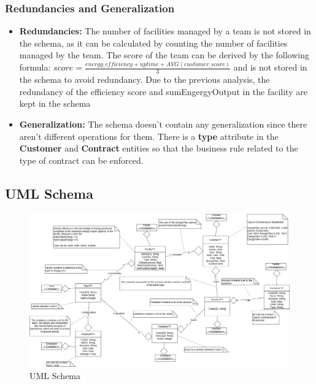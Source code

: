 \subsubsection{Redundancies and Generalization}
\begin{itemize}
    \item \textbf{Redundancies:} The number of facilities managed by a team is not stored in the schema, as it can be calculated by counting the number of facilities managed by the team. The score of the team can be derived by the following formula: $score = \frac{energy\_efficiency + uptime + AVG(customer\_score)}{3}$ and is not stored in the schema to avoid redundancy. Due to the previous analysis, the redundancy of the efficiency score and sumEngergyOutput in the facility are kept in the schema
    \item \textbf{Generalization:} The schema doesn't contain any generalization since there aren't different operations for them. There is a \textbf{type} attribute in the \textbf{Customer} and \textbf{Contract} entities so that the business rule related to the type of contract can be enforced.
\end{itemize}


\subsection{UML Schema}

\begin{figure}[H]
    \centering
    \includegraphics[width=\textwidth]{images/UML.png}
    \caption{UML Schema}
\end{figure}
